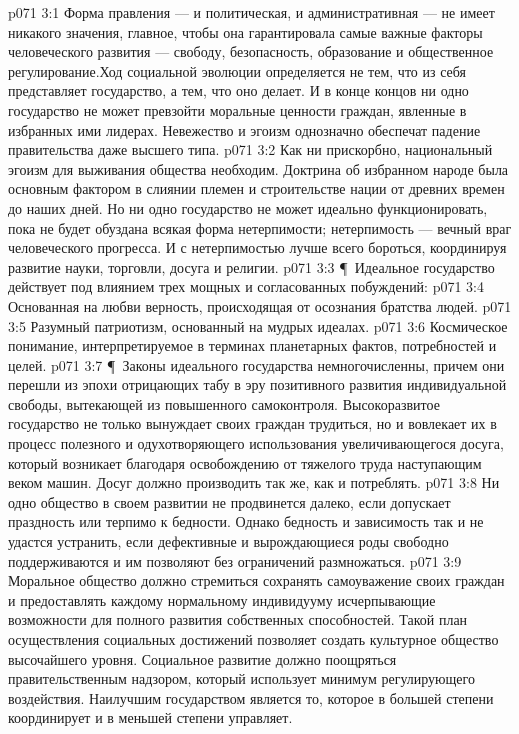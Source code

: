 \vs p071 3:1 Форма правления --- и политическая, и административная --- не имеет никакого значения, главное, чтобы она гарантировала самые важные факторы человеческого развития --- свободу, безопасность, образование и общественное регулирование.Ход социальной эволюции определяется не тем, что из себя представляет государство, а тем, что оно делает. И в конце концов ни одно государство не может превзойти моральные ценности граждан, явленные в избранных ими лидерах. Невежество и эгоизм однозначно обеспечат падение правительства даже высшего типа.
\vs p071 3:2 Как ни прискорбно, национальный эгоизм для выживания общества необходим. Доктрина об избранном народе была основным фактором в слиянии племен и строительстве нации от древних времен до наших дней. Но ни одно государство не может идеально функционировать, пока не будет обуздана всякая форма нетерпимости; нетерпимость --- вечный враг человеческого прогресса. И с нетерпимостью лучше всего бороться, координируя развитие науки, торговли, досуга и религии.
\vs p071 3:3 \P\ Идеальное государство действует под влиянием трех мощных и согласованных побуждений:
\vs p071 3:4 \bibnobreakspace Основанная на любви верность, происходящая от осознания братства людей.
\vs p071 3:5 \bibnobreakspace Разумный патриотизм, основанный на мудрых идеалах.
\vs p071 3:6 \bibnobreakspace Космическое понимание, интерпретируемое в терминах планетарных фактов, потребностей и целей.
\vs p071 3:7 \P\ Законы идеального государства немногочисленны, причем они перешли из эпохи отрицающих табу в эру позитивного развития индивидуальной свободы, вытекающей из повышенного самоконтроля. Высокоразвитое государство не только вынуждает своих граждан трудиться, но и вовлекает их в процесс полезного и одухотворяющего использования увеличивающегося досуга, который возникает благодаря освобождению от тяжелого труда наступающим веком машин. Досуг должно производить так же, как и потреблять.
\vs p071 3:8 Ни одно общество в своем развитии не продвинется далеко, если допускает праздность или терпимо к бедности. Однако бедность и зависимость так и не удастся устранить, если дефективные и вырождающиеся роды свободно поддерживаются и им позволяют без ограничений размножаться.
\vs p071 3:9 Моральное общество должно стремиться сохранять самоуважение своих граждан и предоставлять каждому нормальному индивидууму исчерпывающие возможности для полного развития собственных способностей. Такой план осуществления социальных достижений позволяет создать культурное общество высочайшего уровня. Социальное развитие должно поощряться правительственным надзором, который использует минимум регулирующего воздействия. Наилучшим государством является то, которое в большей степени координирует и в меньшей степени управляет.
